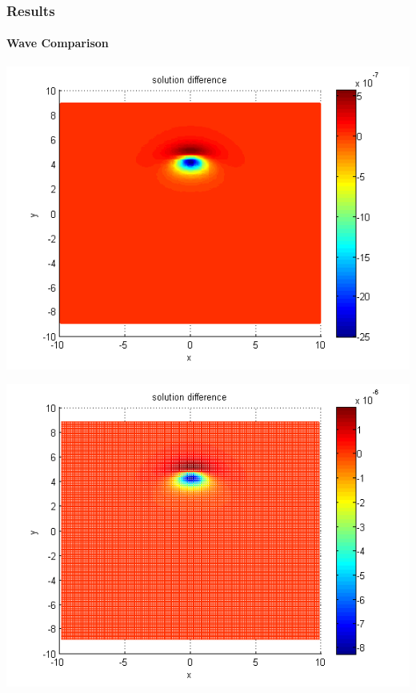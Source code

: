 \documentclass{beamer}
\begin{document}

\begin{frame}
\frametitle{Results}
\framesubtitle{Wave Comparison}
\begin{center}\vspace{0.4cm}
	\begin{minipage}[b]{0.30\linewidth}
		\includegraphics[width=\linewidth]{figures/compare_30_bt3_c045_h005.png}
	\end{minipage}	
	\begin{minipage}[b]{0.30\linewidth}
		\includegraphics[width=\linewidth]{figures/compare_30_bt3_c045_h010.png}
	\end{minipage}	

\end{center}
\end{frame}
\end{document}
